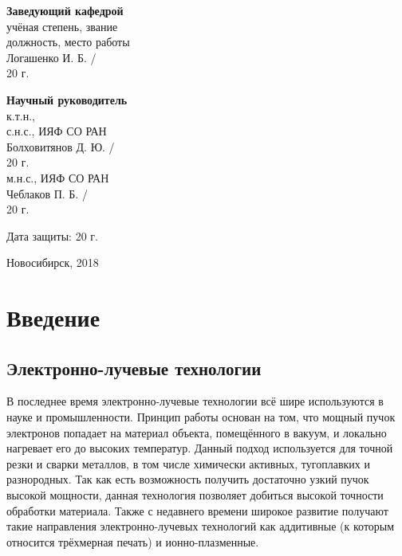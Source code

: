 \documentclass[14pt,russian,a4paper]{extarticle}
\newcommand{\gb}[1]{\guillemotleft #1\guillemotright}
\begin{document}
{\noindent
\begin{minipage}[t]{70mm}
    \begin{center}
    {\bf Заведующий кафедрой} \\
    учёная степень, звание \\
    должность, место работы \\
    Логашенко И. Б. / \makebox[20mm]{\dotfill} \\
    \gb{\makebox[10mm]{\dotfill}} \makebox[30mm]{\dotfill} 20\makebox[5mm]{\dotfill} г.
    \end{center}
\end{minipage}
\hfill
\begin{minipage}[t]{70mm}
    \begin{center}
    {\bf Научный руководитель} \\
    к.т.н., \\
    с.н.с., ИЯФ СО РАН \\
    Болховитянов Д. Ю. / \makebox[20mm]{\dotfill} \\
    \gb{\makebox[10mm]{\dotfill}} \makebox[30mm]{\dotfill} 20\makebox[5mm]{\dotfill} г. \\
    м.н.с., ИЯФ СО РАН \\
    Чеблаков П. Б. / \makebox[20mm]{\dotfill} \\
    \gb{\makebox[10mm]{\dotfill}} \makebox[30mm]{\dotfill} 20\makebox[5mm]{\dotfill} г.
    \end{center}
\end{minipage}

\vspace{4mm}

\begin{flushright}
    Дата защиты: \gb{\makebox[10mm]{\dotfill}} \makebox[30mm]{\dotfill} 20\makebox[5mm]{\dotfill} г.
\end{flushright}

\vfill

\centerline{Новосибирск, 2018}
}

\newpage
\thispagestyle{empty}
\tableofcontents
\newpage

\section{Введение}

\subsection{Электронно-лучевые технологии}
В последнее время электронно-лучевые технологии всё шире используются в науке и промышленности. Принцип работы основан на том, что мощный пучок электронов попадает на материал объекта, помещённого в вакуум, и локально нагревает его до высоких температур. Данный подход используется для точной резки и сварки металлов, в том числе химически активных, тугоплавких и разнородных. Так как есть возможность получить достаточно узкий пучок высокой мощности, данная технология позволяет добиться высокой точности обработки материала. Также с недавнего времени широкое развитие получают такие направления электронно-лучевых технологий как аддитивные (к которым относится трёхмерная печать) и ионно-плазменные.
\end{document}
